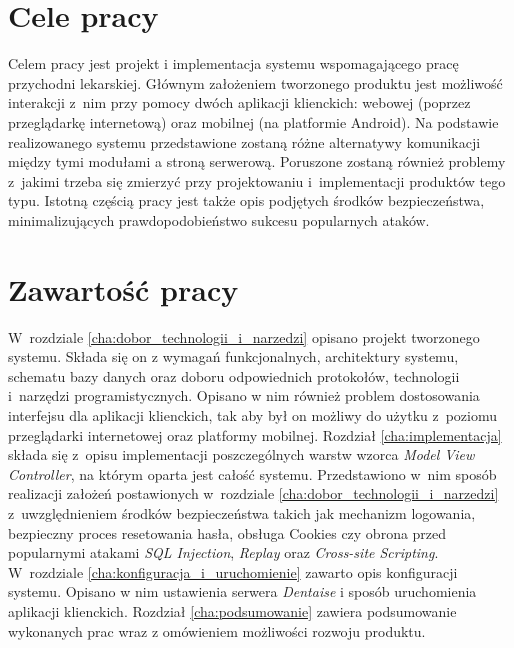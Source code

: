 \documentclass[11pt]{aghdpl}
\begin{document}
\section{Cele pracy}
\label{sec:cele_pracy}

Celem pracy jest projekt i implementacja systemu wspomagającego pracę przychodni lekarskiej. Głównym założeniem tworzonego produktu jest możliwość interakcji z~nim przy pomocy dwóch aplikacji klienckich: webowej (poprzez przeglądarkę internetową) oraz mobilnej (na platformie Android). Na podstawie realizowanego systemu przedstawione zostaną różne alternatywy komunikacji między tymi modułami a stroną serwerową. Poruszone zostaną również problemy z~jakimi trzeba się zmierzyć przy projektowaniu i~implementacji produktów tego typu. Istotną częścią pracy jest także opis podjętych środków bezpieczeństwa, minimalizujących prawdopodobieństwo sukcesu popularnych ataków.

\section{Zawartość pracy}
\label{sec:zawartosc_pracy}

W~rozdziale \ref{cha:dobor_technologii_i_narzedzi} opisano projekt tworzonego systemu. Składa się on z wymagań funkcjonalnych, architektury systemu, schematu bazy danych oraz doboru odpowiednich protokołów, technologii i~narzędzi programistycznych. Opisano w nim również problem dostosowania interfejsu dla aplikacji klienckich, tak aby był on możliwy do użytku z~poziomu przeglądarki internetowej oraz platformy mobilnej. Rozdział \ref{cha:implementacja} składa się z~opisu implementacji poszczególnych warstw wzorca \emph{Model View Controller}, na którym oparta jest całość systemu. Przedstawiono w~nim sposób realizacji założeń postawionych w~rozdziale \ref{cha:dobor_technologii_i_narzedzi} z~uwzględnieniem środków bezpieczeństwa takich jak mechanizm logowania, bezpieczny proces resetowania hasła, obsługa Cookies czy obrona przed popularnymi atakami \emph{SQL Injection}, \emph{Replay} oraz \emph{Cross-site Scripting}. W~rozdziale \ref{cha:konfiguracja_i_uruchomienie} zawarto opis konfiguracji systemu. Opisano w nim ustawienia serwera \emph{Dentaise} i sposób uruchomienia aplikacji klienckich. Rozdział \ref{cha:podsumowanie} zawiera podsumowanie wykonanych prac wraz z omówieniem możliwości rozwoju produktu.

\end{document}
